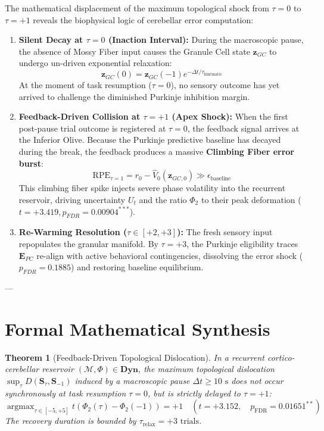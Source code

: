 \documentclass[11pt,twoside,a4paper]{article}
\newtheorem{theorem}{Theorem}
\begin{document}
The mathematical displacement of the maximum topological shock from $\tau = 0$ to $\tau = +1$ reveals the biophysical logic of cerebellar error computation:

\begin{enumerate}
    \item \textbf{Silent Decay at $\tau = 0$ (Inaction Interval):}
    During the macroscopic pause, the absence of Mossy Fiber input causes the Granule Cell state $\mathbf{z}_{GC}$ to undergo un-driven exponential relaxation:
    $$\mathbf{z}_{GC}(0) = \mathbf{z}_{GC}(-1) e^{-\Delta t / \tau_{\text{kinematic}}}$$
    At the moment of task resumption ($\tau = 0$), no sensory outcome has yet arrived to challenge the diminished Purkinje inhibition margin.
    
    \item \textbf{Feedback-Driven Collision at $\tau = +1$ (Apex Shock):}
    When the first post-pause trial outcome is registered at $\tau = 0$, the feedback signal arrives at the Inferior Olive. Because the Purkinje predictive baseline has decayed during the break, the feedback produces a massive \textbf{Climbing Fiber error burst}:
    $$\text{RPE}_{\tau=1} = r_0 - \hat{V}_0(\mathbf{z}_{GC,0}) \gg \epsilon_{\text{baseline}}$$
    This climbing fiber spike injects severe phase volatility into the recurrent reservoir, driving uncertainty $U_t$ and the ratio $\Phi_2$ to their peak deformation ($t = +3.419, p_{FDR} = 0.00904^{***}$).
    
    \item \textbf{Re-Warming Resolution ($\tau \in [+2, +3]$):}
    The fresh sensory input repopulates the granular manifold. By $\tau = +3$, the Purkinje eligibility traces $\mathbf{E}_{PC}$ re-align with active behavioral contingencies, dissolving the error shock ($p_{FDR} = 0.1885$) and restoring baseline equilibrium.
\end{enumerate}

---

\section{Formal Mathematical Synthesis}

\begin{theorem}[Feedback-Driven Topological Dislocation]
In a recurrent cortico-cerebellar reservoir $(\mathcal{M}, \Phi) \in \mathbf{Dyn}$, the maximum topological dislocation $\sup_{\tau} D(\mathbf{S}_\tau, \mathbf{S}_{-1})$ induced by a macroscopic pause $\Delta t \ge 10\text{ s}$ does not occur synchronously at task resumption $\tau = 0$, but is strictly delayed to $\tau = +1$:
\begin{equation}
\operatorname{argmax}_{\tau \in [-5, +5]} t\left(\Phi_2(\tau) - \Phi_2(-1)\right) = +1 \quad \left(t = +3.152, \quad p_{\text{FDR}} = 0.01651^{**}\right)
\end{equation}
The recovery duration is bounded by $\tau_{\text{relax}} = +3\text{ trials}$.
\end{theorem}
\end{document}

